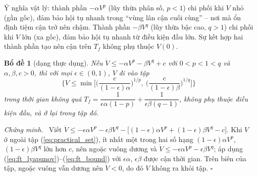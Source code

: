\documentclass[12pt,a4paper]{article}
\newtheorem{bode}{Bổ đề}
\newenvironment{chungminh}{\par\noindent\textit{Chứng minh.}\ }{\hfill$\square$\par\medskip}
\begin{document}
Ý nghĩa vật lý: thành phần $-\alpha V^p$ (lũy thừa phân số, $p < 1$) chi phối khi $V$ nhỏ (gần gốc), đảm bảo hội tụ nhanh trong ``vùng lân cận cuối cùng'' -- nơi mà ổn định tiệm cận trở nên chậm. Thành phần $-\beta V^q$ (lũy thừa bậc cao, $q > 1$) chi phối khi $V$ lớn (xa gốc), đảm bảo hội tụ nhanh từ điều kiện đầu lớn. Sự kết hợp hai thành phần tạo nên cận trên $T_f$ không phụ thuộc $V(0)$.

\begin{bode}[dạng thực dụng]\label{lem:practical_ft}
Nếu $\dot V \leq -\alpha V^p - \beta V^q + c$ với $0 < p < 1 < q$ và $\alpha, \beta, c > 0$, thì với mọi $\epsilon \in (0, 1)$, $V$ đi vào tập
\begin{equation}\label{eq:practical_set}
    \Big\{V \leq \min\Big[\Big(\frac{c}{(1-\epsilon)\alpha}\Big)^{1/p},\ \Big(\frac{c}{(1-\epsilon)\beta}\Big)^{1/q}\Big]\Big\}
\end{equation}
trong thời gian không quá $T_f = \dfrac{1}{\epsilon\alpha(1-p)} + \dfrac{1}{\epsilon\beta(q-1)}$, không phụ thuộc điều kiện đầu, và ở lại trong tập đó.
\end{bode}

\begin{chungminh}
Viết $\dot V \leq -\epsilon\alpha V^p - \epsilon\beta V^q - \big[(1-\epsilon)\alpha V^p + (1-\epsilon)\beta V^q - c\big]$. Khi $V$ ở ngoài tập (\ref{eq:practical_set}), ít nhất một trong hai số hạng $(1-\epsilon)\alpha V^p$, $(1-\epsilon)\beta V^q$ lớn hơn $c$, nên ngoặc vuông dương và $\dot V \leq -\epsilon\alpha V^p - \epsilon\beta V^q$; áp dụng (\ref{eq:ft_lyapunov})--(\ref{eq:ft_bound}) với $\epsilon\alpha$, $\epsilon\beta$ được cận thời gian. Trên biên của tập, ngoặc vuông vẫn dương nên $\dot V < 0$, do đó $V$ không ra khỏi tập.
\end{chungminh}
\end{document}
